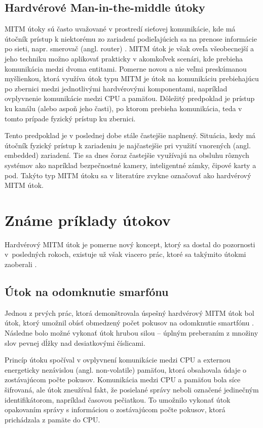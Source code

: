 \subsection{Hardvérové Man-in-the-middle útoky}
MITM útoky sú často uvažované v prostredí sieťovej komunikácie, kde má útočník prístup k niektorému zo zariadení podieľajúcich sa na prenose informácie po sieti, napr. smerovač (angl. router) \cite{mitmTheory}. MITM útok je však oveľa všeobecnejší a jeho techniku možno aplikovať prakticky v akomkoľvek scenári, kde prebieha komunikácia medzi dvoma entitami. Pomerne novou a nie veľmi preskúmanou myšlienkou, ktorá využíva útok typu MITM je útok na komunikáciu prebiehajúcu po zbernici medzi jednotlivými hardvérovými komponentami, napríklad ovplyvnenie komunikácie medzi CPU a pamäťou. Dôležitý predpoklad je prístup ku kanálu (alebo aspoň jeho časti), po ktorom prebieha komunikácia, teda v tomto prípade fyzický prístup ku zbernici.

Tento predpoklad je v poslednej dobe stále častejšie naplnený. Situácia, kedy má útočník fyzický prístup k zariadeniu je najčastejšie pri využití vnorených (angl. embedded) zariadení. Tie sa dnes čoraz častejšie využívajú na obsluhu rôznych systémov ako napríklad bezpečnostné kamery, inteligentné zámky, čipové karty a pod. Takýto typ MITM útoku sa v literatúre zvykne označovať ako hardvérový MITM útok.

\section{Známe príklady útokov}
Hardvérový MITM útok je pomerne nový koncept, ktorý sa dostal do pozornosti v~posledných rokoch, existuje už však viacero prác, ktoré sa takýmito útokmi zaoberali \cite{mitmPCIe, mitmTouch, mitmCAN, mitmI2C, mitmSPI}.

\subsection{Útok na odomknutie smarfónu}
Jednou z prvých prác, ktorá demonštrovala úspešný hardvérový MITM útok bol útok, ktorý umožnil obísť obmedzený počet pokusov na odomknutie
smartfónu \cite{mitmPCIe}. Následne bolo možné vykonať útok hrubou silou -- úplným preberaním z množiny slov  pevnej dĺžky nad desiatkovými číslicami.

Princíp útoku spočíval v ovplyvnení komunikácie medzi CPU a externou energeticky nezávislou (angl. non-volatile) pamäťou, ktorá obsahovala údaje o zostávajúcom počte pokusov. Komunikácia medzi CPU a pamäťou bola síce šifrovaná, ale útok zneužíval fakt, že posielané správy neboli označené jedinečným identifikátorom, napríklad časovou pečiatkou. To umožnilo vykonať útok opakovaním správy s informáciou o zostávajúcom počte pokusov, ktorá prichádzala z pamäte do CPU.

